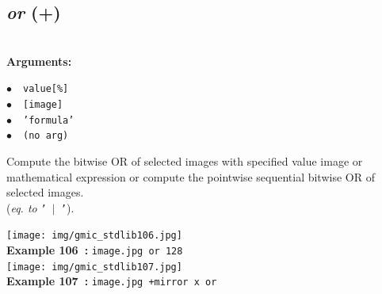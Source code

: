 \documentclass[a4paper,10.5pt,twoside]{book}
\def\comma{\discretionary{,}{}{,}}
\newcommand{\Cb}[1]{\textcolor{cb}{#1}}
\begin{document}
\subsection{\emph{or} (+)}\vspace*{-0.7em}
~\\\textbf{\Cb{Arguments: }}\begin{flushleft}
{\small \Cb{\hspace*{0.5cm}$\bullet$~~\texttt{value[\%]}}}~~~\\
{\small \Cb{\hspace*{0.5cm}$\bullet$~~\texttt{[image]}}}~~~\\
{\small \Cb{\hspace*{0.5cm}$\bullet$~~\texttt{'formula'}}}~~~\\
{\small \Cb{\hspace*{0.5cm}$\bullet$~~\texttt{(no arg)}}}\end{flushleft}
Compute the bitwise OR of selected images with specified value{\comma} image or mathematical
expression{\comma} or compute the pointwise sequential bitwise OR of selected images.
~\\(\emph{eq. to} {\small \texttt{'~$|$~'}}).
\begin{center}\texttt{[image: img/gmic\_stdlib106.jpg]}\\
{\footnotesize \textbf{Example 106~:} \texttt{image.jpg or 128}}
\\\texttt{[image: img/gmic\_stdlib107.jpg]}\\
{\footnotesize \textbf{Example 107~:} \texttt{image.jpg +mirror x or}}
\end{center}
\end{document}
